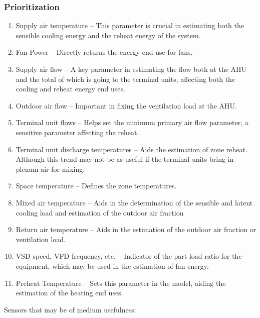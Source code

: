\subsubsection{Prioritization} \label{sec:Prioritization}
\begin{enumerate}
\item Supply air temperature -- This parameter is crucial in estimating both the sensible cooling energy and the reheat energy of the system. 
\item Fan Power -- Directly returns the energy end use for fans.
\item Supply air flow -- A key parameter in estimating the flow both at the AHU and the total of which is going to the terminal units, affecting both the cooling and reheat energy end uses.
\item Outdoor air flow -- Important in fixing the ventilation load at the AHU.
\item Terminal unit flows -- Helps set the minimum primary air flow parameter, a sensitive parameter affecting the reheat. 
\item Terminal unit discharge temperatures -- Aids the estimation of
    zone reheat. Although this trend may not be as useful if the
    terminal units bring in plenum air for mixing. 
\item Space temperature -- Defines the zone temperatures. 
\item Mixed air temperature -- Aids in the determination of the sensible
    and latent cooling load and estimation of the outdoor air fraction
\item Return air temperature -- Aids in the estimation of the outdoor air fraction or ventilation load.
\item VSD speed, VFD frequency, etc. -- Indicator of the part-load ratio for the equipment, which may be used in the estimation of fan energy. 
\item Preheat Temperature -- Sets this parameter in the model, aiding the estimation of the heating end uses.
\end{enumerate}

Sensors that may be of medium usefulness:

